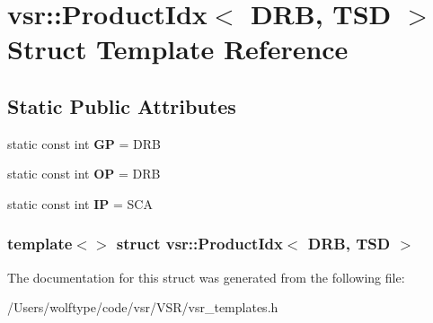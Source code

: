 \hypertarget{structvsr_1_1_product_idx_3_01_d_r_b_00_01_t_s_d_01_4}{\section{vsr\-:\-:Product\-Idx$<$ D\-R\-B, T\-S\-D $>$ Struct Template Reference}
\label{structvsr_1_1_product_idx_3_01_d_r_b_00_01_t_s_d_01_4}
}
\subsection*{Static Public Attributes}
\begin{DoxyCompactItemize}
\item 
\hypertarget{structvsr_1_1_product_idx_3_01_d_r_b_00_01_t_s_d_01_4_a91f487a99530093def0ff464b43b8e99}{static const int {\bfseries G\-P} = D\-R\-B}\label{structvsr_1_1_product_idx_3_01_d_r_b_00_01_t_s_d_01_4_a91f487a99530093def0ff464b43b8e99}

\item 
\hypertarget{structvsr_1_1_product_idx_3_01_d_r_b_00_01_t_s_d_01_4_ace22862c11aca9c69a12f2bac131c5ff}{static const int {\bfseries O\-P} = D\-R\-B}\label{structvsr_1_1_product_idx_3_01_d_r_b_00_01_t_s_d_01_4_ace22862c11aca9c69a12f2bac131c5ff}

\item 
\hypertarget{structvsr_1_1_product_idx_3_01_d_r_b_00_01_t_s_d_01_4_a08355f7805f7baaa3206c1ae281b3c73}{static const int {\bfseries I\-P} = S\-C\-A}\label{structvsr_1_1_product_idx_3_01_d_r_b_00_01_t_s_d_01_4_a08355f7805f7baaa3206c1ae281b3c73}

\end{DoxyCompactItemize}
\subsubsection*{template$<$$>$ struct vsr\-::\-Product\-Idx$<$ D\-R\-B, T\-S\-D $>$}



The documentation for this struct was generated from the following file\-:\begin{DoxyCompactItemize}
\item 
/\-Users/wolftype/code/vsr/\-V\-S\-R/vsr\-\_\-templates.\-h\end{DoxyCompactItemize}
